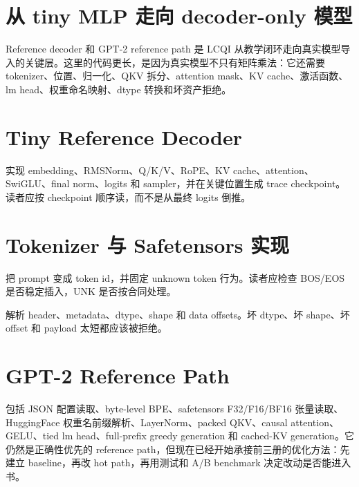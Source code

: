 \section{从 tiny MLP 走向 decoder-only 模型}

Reference decoder 和 GPT-2 reference path 是 LCQI 从教学闭环走向真实模型导入的关键层。这里的代码更长，是因为真实模型不只有矩阵乘法：它还需要 tokenizer、位置、归一化、QKV 拆分、attention mask、KV cache、激活函数、lm head、权重命名映射、dtype 转换和坏资产拒绝。

\section{Tiny Reference Decoder}

 实现 embedding、RMSNorm、Q/K/V、RoPE、KV cache、attention、SwiGLU、final norm、logits 和 sampler，并在关键位置生成 trace checkpoint。读者应按 checkpoint 顺序读，而不是从最终 logits 倒推。



\section{Tokenizer 与 Safetensors 实现}

 把 prompt 变成 token id，并固定 unknown token 行为。读者应检查 BOS/EOS 是否稳定插入，UNK 是否按合同处理。



 解析 header、metadata、dtype、shape 和 data offsets。坏 dtype、坏 shape、坏 offset 和 payload 太短都应该被拒绝。



\section{GPT-2 Reference Path}

 包括 JSON 配置读取、byte-level BPE、safetensors F32/F16/BF16 张量读取、HuggingFace 权重名前缀解析、LayerNorm、packed QKV、causal attention、GELU、tied lm head、full-prefix greedy generation 和 cached-KV generation。它仍然是正确性优先的 reference path，但现在已经开始承接前三册的优化方法：先建立 baseline，再改 hot path，再用测试和 A/B benchmark 决定改动是否能进入书。

